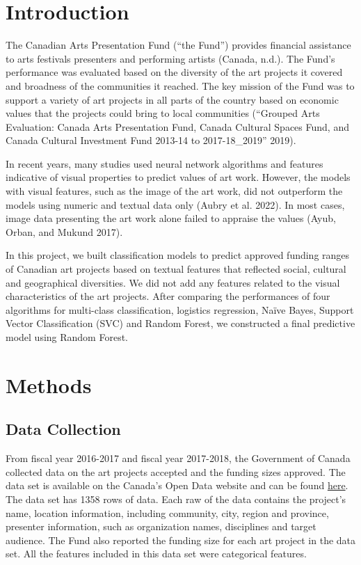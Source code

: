 \documentclass[
]{article}
\begin{document}
\hypertarget{introduction}{%
\section{Introduction}\label{introduction}}

The Canadian Arts Presentation Fund (``the Fund'') provides financial
assistance to arts festivals presenters and performing artists (Canada,
n.d.). The Fund's performance was evaluated based on the diversity of
the art projects it covered and broadness of the communities it reached.
The key mission of the Fund was to support a variety of art projects in
all parts of the country based on economic values that the projects
could bring to local communities ({``Grouped Arts Evaluation: Canada
Arts Presentation Fund, Canada Cultural Spaces Fund, and Canada Cultural
Investment Fund 2013-14 to 2017-18\_2019''} 2019).

In recent years, many studies used neural network algorithms and
features indicative of visual properties to predict values of art work.
However, the models with visual features, such as the image of the art
work, did not outperform the models using numeric and textual data only
(Aubry et al. 2022). In most cases, image data presenting the art work
alone failed to appraise the values (Ayub, Orban, and Mukund 2017).

In this project, we built classification models to predict approved
funding ranges of Canadian art projects based on textual features that
reflected social, cultural and geographical diversities. We did not add
any features related to the visual characteristics of the art projects.
After comparing the performances of four algorithms for multi-class
classification, logistics regression, Naïve Bayes, Support Vector
Classification (SVC) and Random Forest, we constructed a final
predictive model using Random Forest.

\hypertarget{methods}{%
\section{Methods}\label{methods}}

\hypertarget{data-collection}{%
\subsection{Data Collection}\label{data-collection}}

From fiscal year 2016-2017 and fiscal year 2017-2018, the Government of
Canada collected data on the art projects accepted and the funding sizes
approved. The data set is available on the Canada's Open Data website
and can be found
\href{https://open.canada.ca/data/en/dataset/92984c11-6fd4-40c4-b23c-e8832e1f4cd5}{here}.
The data set has 1358 rows of data. Each raw of the data contains the
project's name, location information, including community, city, region
and province, presenter information, such as organization names,
disciplines and target audience. The Fund also reported the funding size
for each art project in the data set. All the features included in this
data set were categorical features.
\end{document}
